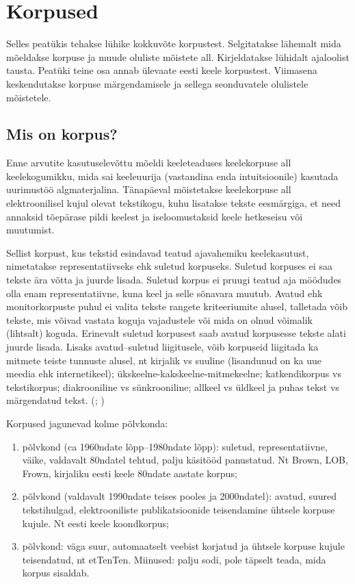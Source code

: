 \documentclass[12pt]{article}
\begin{document}
\newpage
\section{Korpused}
Selles peatükis tehakse lühike kokkuvõte korpustest. Selgitatakse lähemalt mida mõeldakse korpuse ja muude
oluliste mõistete all. Kirjeldatakse lühidalt ajaloolist tausta. Peatüki teine osa annab ülevaate eesti keele korpustest. Viimasena keskendutakse korpuse märgendamisele ja sellega seonduvatele olulistele mõistetele.

\subsection{Mis on korpus?}
Enne arvutite kasutuselevõttu mõeldi keeleteaduses keelekorpuse all keelekogumikku, mida sai keeleuurija (vastandina enda intuitsioonile) kasutada uurimustöö algmaterjalina. Tänapäeval mõistetakse
keelekorpuse all elektroonilisel kujul olevat tekstikogu, kuhu lisatakse tekste eesmärgiga, et need annaksid
tõepärase pildi keelest ja iseloomustaksid keele hetkeseisu või muutumist. \citep[9]{KR}

Sellist korpust, kus tekstid esindavad teatud ajavahemiku keelekasutust, nimetatakse representatiivseks ehk suletud korpuseks. Suletud korpuses ei saa tekste ära võtta ja juurde lisada. Suletud korpus ei pruugi teatud aja möödudes olla enam representatiivne, kuna keel ja selle sõnavara muutub. Avatud ehk monitorkorpuste puhul ei valita tekste rangete kriteeriumite alusel, talletada võib tekste, mis võivad vastata koguja vajadustele või mida on olnud võimalik (lihtsalt) koguda. Erinevalt suletud korpusest saab avatud korpusesse tekste alati juurde lisada. Lisaks avatud--suletud liigitusele, võib korpuseid liigitada ka mitmete teiste tunnuste alusel, nt kirjalik vs suuline (lisandunud on ka uue meedia ehk internetikeel); ükskeelne-kakskeelne-mitmekeelne; katkendikorpus vs tekstikorpus; diakrooniline vs sünkrooniline; allkeel vs üldkeel ja puhas tekst vs märgendatud tekst. (\citealp[9--11]{KR}; \citealp[9--13]{KORPUS})

Korpused jagunevad kolme põlvkonda:
\begin{enumerate}
\item põlvkond (ca 1960ndate lõpp--1980ndate lõpp): suletud, representatiivne, väike, valdavalt 80ndatel
tehtud, palju käsitööd panustatud. Nt Brown, LOB, Frown, kirjaliku eesti keele 80ndate aastate korpus;
\item põlvkond (valdavalt 1990ndate teises pooles ja 2000ndatel): avatud, suured tekstihulgad,
elektrooniliste publikatsioonide teisendamine ühtsele korpuse kujule. Nt eesti keele koondkorpus;
\item põlvkond: väga suur, automaatselt veebist korjatud ja ühtsele korpuse kujule teisendatud, nt etTenTen. Miinused: palju sodi, pole täpselt teada, mida korpus sisaldab. \citep[37--38]{M_OK2015}
\end{enumerate}
\end{document}
